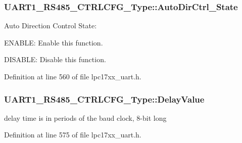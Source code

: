 \subsubsection[{\texorpdfstring{Auto\+Dir\+Ctrl\+\_\+\+State}{AutoDirCtrl_State}}]{ U\+A\+R\+T1\+\_\+\+R\+S485\+\_\+\+C\+T\+R\+L\+C\+F\+G\+\_\+\+Type\+::\+Auto\+Dir\+Ctrl\+\_\+\+State}\hypertarget{struct_u_a_r_t1___r_s485___c_t_r_l_c_f_g___type_a6596686b19bae7e391c53cba9299a983}{}\label{struct_u_a_r_t1___r_s485___c_t_r_l_c_f_g___type_a6596686b19bae7e391c53cba9299a983}
Auto Direction Control State\+:
\begin{DoxyItemize}
\item E\+N\+A\+B\+LE\+: Enable this function.
\item D\+I\+S\+A\+B\+LE\+: Disable this function. 
\end{DoxyItemize}

Definition at line 560 of file lpc17xx\+\_\+uart.\+h.

\subsubsection[{\texorpdfstring{Delay\+Value}{DelayValue}}]{ U\+A\+R\+T1\+\_\+\+R\+S485\+\_\+\+C\+T\+R\+L\+C\+F\+G\+\_\+\+Type\+::\+Delay\+Value}\hypertarget{struct_u_a_r_t1___r_s485___c_t_r_l_c_f_g___type_accdbb998ed22a2ba62ba6ed131dbae16}{}\label{struct_u_a_r_t1___r_s485___c_t_r_l_c_f_g___type_accdbb998ed22a2ba62ba6ed131dbae16}
delay time is in periods of the baud clock, 8-\/bit long 

Definition at line 575 of file lpc17xx\+\_\+uart.\+h.

